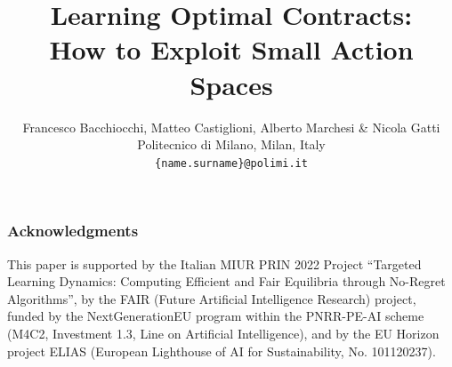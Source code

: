 \documentclass{article} %
\title{Learning Optimal Contracts:\\How to Exploit Small Action Spaces}
\author{Francesco Bacchiocchi, Matteo Castiglioni, Alberto Marchesi \& Nicola Gatti %
	\\
	Politecnico di Milano, Milan, Italy\\
	\texttt{\{name.surname\}@polimi.it}
}
\theoremstyle{eventtheoremstyle}
\begin{document}
\maketitle





%





\subsubsection*{Acknowledgments}

This paper is supported by the Italian MIUR PRIN 2022 Project “Targeted Learning Dynamics: Computing Efficient and Fair Equilibria through No-Regret Algorithms”, by the FAIR (Future Artificial Intelligence Research) project, funded by the NextGenerationEU program within the PNRR-PE-AI scheme (M4C2, Investment 1.3, Line on Artificial Intelligence), and by the EU Horizon project ELIAS (European Lighthouse of AI for Sustainability, No. 101120237).




\clearpage
\appendix






\end{document}
